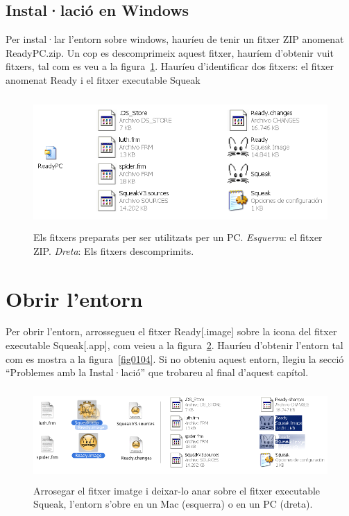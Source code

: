 \subsection{Instal·lació en Windows}
Per instal·lar l'entorn sobre windows, hauríeu de tenir un fitxer ZIP anomenat \textsf{ReadyPC.zip}. Un cop es descomprimeix aquest fitxer, hauríem d'obtenir vuit fitxers, tal com es veu a la figura~\ref{fig0102}.  Hauríeu d'identificar dos fitxers: el fitxer anomenat \textsf{Ready} i el fitxer executable \textsf{Squeak}

\begin{figure}[h]
\begin{center}
\includegraphics[height=50mm ,width=127mm ]{Imatges/CarpetaReadyPC.PNG}
\end{center}
\caption{Els fitxers preparats per ser utilitzats per un PC. \emph{Esquerra}: el fitxer ZIP. \emph{Dreta}: Els fitxers descomprimits.}
\label{fig0102}
\end{figure}

\section{Obrir l'entorn}
Per obrir l'entorn, arrossegueu el fitxer \textsf{Ready}[\textsf{.image}]  sobre la icona del fitxer executable \textsf{Squeak}[\textsf{.app}], com veieu a la figura~\ref{fig0103}. Hauríeu d'obtenir l'entorn tal com es mostra a la figura~\ref{fig0104}. Si no obteniu aquest entorn, llegiu la secció ``Problemes amb la Instal·lació'' que trobareu al final d'aquest capítol.  

\begin{figure}[h]
\begin{center}
\includegraphics[height=35mm ,width=140mm ]{Imatges/fusio.png}
\end{center}
\caption{Arrosegar el fitxer imatge i deixar-lo anar sobre el fitxer executable \textsf{\upshape Squeak}, l'entorn s'obre en un Mac (esquerra) o en un PC (dreta).}
\label{fig0103}
\end{figure}

